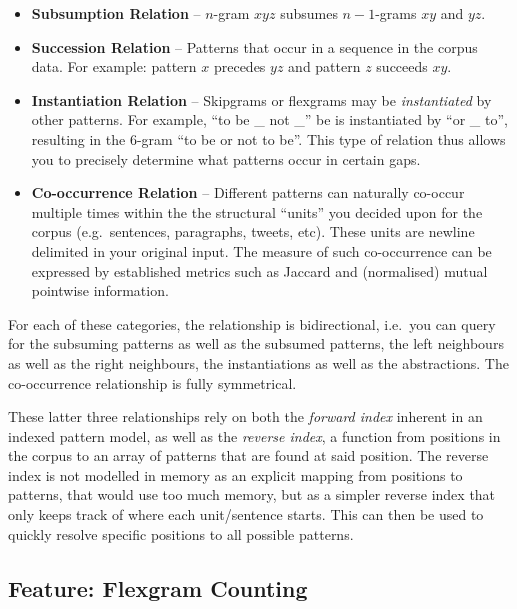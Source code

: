 \begin{itemize}
 \item \textbf{Subsumption Relation} -- $n$-gram $x y z$ subsumes $n-1$-grams $x y$ and $y z$.
 \item \textbf{Succession Relation} -- Patterns that occur in a sequence in the
     corpus data. For example: pattern $x$ precedes $yz$ and pattern $z$ succeeds $xy$.
 \item \textbf{Instantiation Relation} -- Skipgrams or flexgrams may be
     \emph{instantiated} by other patterns. For example, ``to be \_ not \_'' be
     is instantiated by ``or \_ to'', resulting in the 6-gram ``to be or not to be''. This type of relation thus allows you to precisely determine what patterns occur in certain gaps.
 \item \textbf{Co-occurrence Relation} -- Different patterns can naturally co-occur multiple times
     within the the structural ``units'' you decided upon for the corpus (e.g.\
     sentences, paragraphs, tweets, etc). These units are newline delimited in
     your original input. The measure of such co-occurrence
     can be expressed by established metrics such as Jaccard and (normalised) mutual
     pointwise information.
\end{itemize}

For each of these categories, the relationship is bidirectional, i.e.\ you can
query for the subsuming patterns as well as the subsumed patterns, the left
neighbours as well as the right neighbours, the instantiations as well as the
abstractions. The co-occurrence relationship is fully symmetrical.

These latter three relationships rely on both the \emph{forward index} inherent
in an indexed pattern model, as well as the \emph{reverse index}, a function
from positions in the corpus to an array of patterns that are found at said
position. The reverse index is not modelled in memory as an explicit mapping
from positions to patterns, that would use too much memory, but as a simpler
reverse index that only keeps track of where each unit/sentence starts. This
can then be used to quickly resolve specific positions to all possible
patterns.

\subsection*{Feature: Flexgram Counting}

